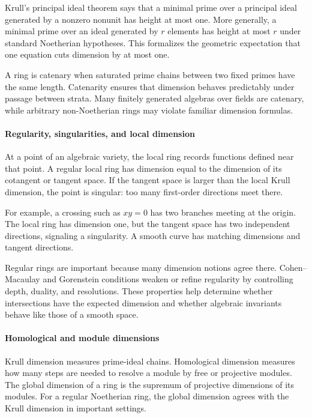 Krull's principal ideal theorem says that a minimal prime over a principal ideal generated by a nonzero nonunit has height at most one. More generally, a minimal prime over an ideal generated by $r$ elements has height at most $r$ under standard Noetherian hypotheses. This formalizes the geometric expectation that one equation cuts dimension by at most one.

A ring is catenary when saturated prime chains between two fixed primes have the same length. Catenarity ensures that dimension behaves predictably under passage between strata. Many finitely generated algebras over fields are catenary, while arbitrary non-Noetherian rings may violate familiar dimension formulas. \cite{dimension_theory_ref2,dimension_theory_ref4}

\paragraph{Regularity, singularities, and local dimension}

At a point of an algebraic variety, the local ring records functions defined near that point. A regular local ring has dimension equal to the dimension of its cotangent or tangent space. If the tangent space is larger than the local Krull dimension, the point is singular: too many first-order directions meet there.

For example, a crossing such as $xy=0$ has two branches meeting at the origin. The local ring has dimension one, but the tangent space has two independent directions, signaling a singularity. A smooth curve has matching dimensions and tangent directions.

Regular rings are important because many dimension notions agree there. Cohen--Macaulay and Gorenstein conditions weaken or refine regularity by controlling depth, duality, and resolutions. These properties help determine whether intersections have the expected dimension and whether algebraic invariants behave like those of a smooth space. \cite{dimension_theory_ref5}

\paragraph{Homological and module dimensions}

Krull dimension measures prime-ideal chains. Homological dimension measures how many steps are needed to resolve a module by free or projective modules. The global dimension of a ring is the supremum of projective dimensions of its modules. For a regular Noetherian ring, the global dimension agrees with the Krull dimension in important settings.

